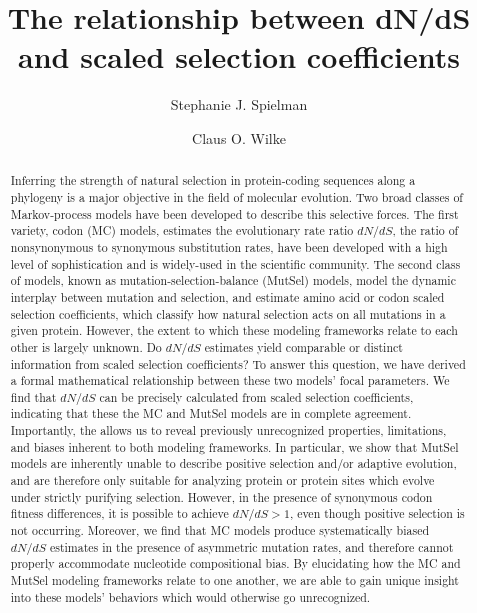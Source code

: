 \documentclass{pnastwo}
\begin{document}
	
	
\title{The relationship between dN/dS and scaled selection coefficients}

\author{Stephanie J. Spielman 
	\and
	Claus O. Wilke}


\maketitle
\begin{article}
	
\begin{abstract} %
Inferring the strength of natural selection in protein-coding sequences along a phylogeny is a major objective in the field of molecular evolution. Two broad classes of Markov-process models have been developed to describe this selective forces. The first variety,  codon (MC) models, estimates the evolutionary rate ratio $dN/dS$, the ratio of nonsynonymous to synonymous substitution rates, have been developed with a high level of sophistication and is widely-used in the scientific community. The second class of models, known as mutation-selection-balance (MutSel) models, model the dynamic interplay between mutation and selection, and estimate amino acid or codon scaled selection coefficients, which classify how natural selection acts on all mutations in a given protein. However, the extent to which these modeling frameworks relate to each other is largely unknown. Do $dN/dS$ estimates yield comparable or distinct information from scaled selection coefficients? To answer this question, we have derived a formal mathematical relationship between these two models' focal parameters. We find that $dN/dS$ can be precisely calculated from scaled selection coefficients, indicating that these the MC and MutSel models are in complete agreement. Importantly, the  allows us to reveal previously unrecognized properties, limitations, and biases inherent to both modeling frameworks. In particular, we show that MutSel models are inherently unable to describe positive selection and/or adaptive evolution, and are therefore only suitable for analyzing protein or protein sites which evolve under strictly purifying selection. However, in the presence of synonymous codon fitness differences, it is possible to achieve $dN/dS > 1$, even though positive selection is not occurring. Moreover, we find that MC models produce systematically biased $dN/dS$ estimates in the presence of asymmetric mutation rates, and therefore cannot properly accommodate nucleotide compositional bias. By elucidating how the MC and MutSel modeling frameworks relate to one another, we are able to gain unique insight into these models' behaviors which would otherwise go unrecognized.
\end{abstract}


\end{article}
\end{document}
